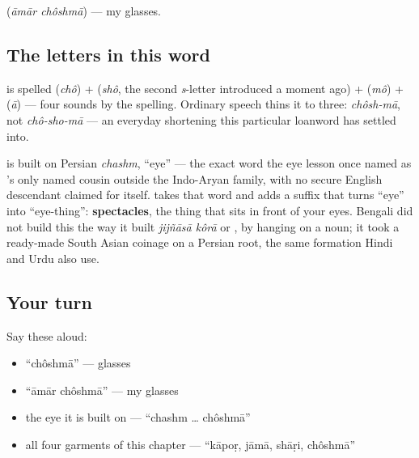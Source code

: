   (\emph{āmār chôshmā}) — my glasses.

\subsection*{The letters in this word}
\textbf{} is spelled \textbf{} (\emph{chô}) + \textbf{} (\emph{shô}, the second \emph{s}-letter  introduced a moment ago) + \textbf{} (\emph{mô}) + \textbf{} (\emph{ā}) — four sounds by the spelling. Ordinary speech thins it to three: \emph{chôsh-mā}, not \emph{chô-sho-mā} — an everyday shortening this particular loanword has settled into.

\begin{cousinweb}
\textbf{} is built on Persian \emph{chashm}, \textquotedblleft{}eye\textquotedblright{} — the exact word the eye lesson once named as 's only named cousin outside the Indo-Aryan family, with no secure English descendant claimed for  itself.  takes that word and adds a suffix that turns \textquotedblleft{}eye\textquotedblright{} into \textquotedblleft{}eye-thing\textquotedblright{}: \textbf{spectacles}, the thing that sits in front of your eyes. Bengali did not build this the way it built \emph{jijñāsā kôrā} or  , by hanging  on a noun; it took a ready-made South Asian coinage on a Persian root, the same formation Hindi and Urdu also use.
\end{cousinweb}

\subsection*{Your turn}
Say these aloud:

\begin{itemize}
\raggedright
  \item \textquotedblleft{}chôshmā\textquotedblright{} — glasses
  \item \textquotedblleft{}āmār chôshmā\textquotedblright{} — my glasses
  \item the eye it is built on — \textquotedblleft{}chashm … chôshmā\textquotedblright{}
  \item all four garments of this chapter — \textquotedblleft{}kāpoṛ, jāmā, shāṛi, chôshmā\textquotedblright{}
\end{itemize}

